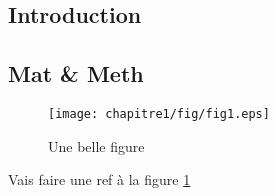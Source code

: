 \subsection{Introduction}\label{introduction}

\subsection{Mat \& Meth}\label{mat-meth}

\begin{figure}[htbp]
\centering
\texttt{[image: chapitre1/fig/fig1.eps]}
\caption{Une belle figure\label{fig:chap1_1}}
\end{figure}

Vais faire une ref à la figure \ref{fig:chap1_1}
